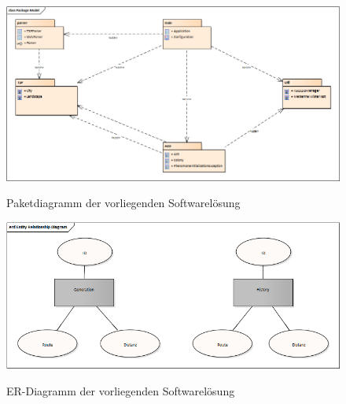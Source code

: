 \begin{appendices}
	
	\begin{figure}[h]
		\centering
		\caption{Paketdiagramm der vorliegenden Softwarelösung}
		\includegraphics[width=\linewidth]{../../../01_uml/packageModel.png}
		\label{packageDiagram}
	\end{figure}

	\begin{figure}[h]
		\centering
		\caption{ER-Diagramm der vorliegenden Softwarelösung}
		\includegraphics[width=\linewidth]{../../../01_uml/erDiagram.png}
		\label{erDiagram}
	\end{figure}


\end{appendices}
